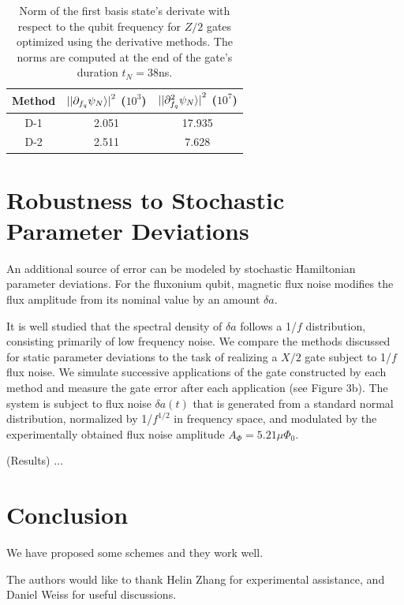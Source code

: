 \documentclass[
  amsfonts,
  amsmath,
  tbtags,
  amssymb,
  aps,
  nobibnotes,
  twocolumn,
  superscriptaddress,
]{revtex4-2}
\begin{document}
\begin{table}
  \begin{tabular}{c | c | c}
    Method & ${\lvert \ket{\partial_{f_{q}} \psi_{N}} \rvert}^{2}$ ($10^{3}$)
    & ${\lvert \ket{\partial^{2}_{f_{q}} \psi_{N}} \rvert}^{2}$ ($10^{7}$)\\
    \hline
    D-1 & 2.051 & 17.935\\
    D-2 & 2.511 & 7.628\\
  \end{tabular}
  \caption{Norm of the first basis state's derivate with respect to the qubit frequency
    for $Z/2$ gates optimized using the derivative methods. The norms are computed
    at the end of the gate's duration $t_{N} = 38$ns.}
\end{table}

\section{Robustness to Stochastic Parameter Deviations}
An additional source of error can be modeled by stochastic
Hamiltonian parameter deviations. For the fluxonium qubit, magnetic flux noise
modifies the flux amplitude from its nominal value by an amount $\delta a$.

It is well studied that the spectral density of $\delta a$ follows a
1/$f$ distribution, consisting primarily of low frequency noise. We compare
the methods discussed for static parameter deviations to the task of
realizing a $X/2$ gate subject to 1/$f$ flux noise. We simulate successive
applications of the gate constructed by each method and measure the gate error
after each application (see Figure 3b). The system is subject to flux noise
$\delta a (t)$ that is generated from a standard normal distribution, normalized
by 1/$f^{1/2}$ in frequency space, and modulated by the experimentally obtained
flux noise amplitude $A_{\Phi} = 5.21 \mu \Phi_{0}$.

(Results) ...


\section{Conclusion}
We have proposed some schemes and they work well.


\begin{acknowledgments}
  The authors would like to thank Helin Zhang for experimental assistance,
  and Daniel Weiss for useful discussions.
\end{acknowledgments}
\end{document}
